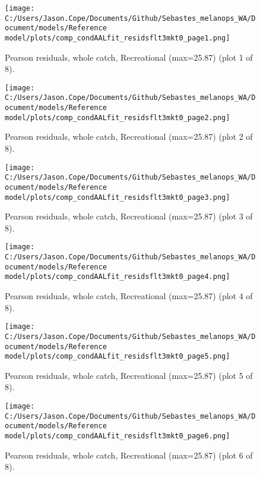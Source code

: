 \documentclass[11pt,
  letterpaper,
]{article}
\begin{document}
\begin{figure}
{\centering
\texttt{[image: C:/Users/Jason.Cope/Documents/Github/Sebastes\_melanops\_WA/Document/models/Reference model/plots/comp\_condAALfit\_residsflt3mkt0\_page1.png]}
}
\caption{Pearson residuals, whole catch, Recreational (max=25.87) (plot 1 of 8).\label{fig:comp_condAALfit_residsflt3mkt0_page1}}
\end{figure}

\begin{figure}
{\centering
\texttt{[image: C:/Users/Jason.Cope/Documents/Github/Sebastes\_melanops\_WA/Document/models/Reference model/plots/comp\_condAALfit\_residsflt3mkt0\_page2.png]}
}
\caption{Pearson residuals, whole catch, Recreational (max=25.87) (plot 2 of 8).\label{fig:comp_condAALfit_residsflt3mkt0_page2}}
\end{figure}

\begin{figure}
{\centering
\texttt{[image: C:/Users/Jason.Cope/Documents/Github/Sebastes\_melanops\_WA/Document/models/Reference model/plots/comp\_condAALfit\_residsflt3mkt0\_page3.png]}
}
\caption{Pearson residuals, whole catch, Recreational (max=25.87) (plot 3 of 8).\label{fig:comp_condAALfit_residsflt3mkt0_page3}}
\end{figure}

\begin{figure}
{\centering
\texttt{[image: C:/Users/Jason.Cope/Documents/Github/Sebastes\_melanops\_WA/Document/models/Reference model/plots/comp\_condAALfit\_residsflt3mkt0\_page4.png]}
}
\caption{Pearson residuals, whole catch, Recreational (max=25.87) (plot 4 of 8).\label{fig:comp_condAALfit_residsflt3mkt0_page4}}
\end{figure}

\begin{figure}
{\centering
\texttt{[image: C:/Users/Jason.Cope/Documents/Github/Sebastes\_melanops\_WA/Document/models/Reference model/plots/comp\_condAALfit\_residsflt3mkt0\_page5.png]}
}
\caption{Pearson residuals, whole catch, Recreational (max=25.87) (plot 5 of 8).\label{fig:comp_condAALfit_residsflt3mkt0_page5}}
\end{figure}

\begin{figure}
{\centering
\texttt{[image: C:/Users/Jason.Cope/Documents/Github/Sebastes\_melanops\_WA/Document/models/Reference model/plots/comp\_condAALfit\_residsflt3mkt0\_page6.png]}
}
\caption{Pearson residuals, whole catch, Recreational (max=25.87) (plot 6 of 8).\label{fig:comp_condAALfit_residsflt3mkt0_page6}}
\end{figure}
\end{document}
